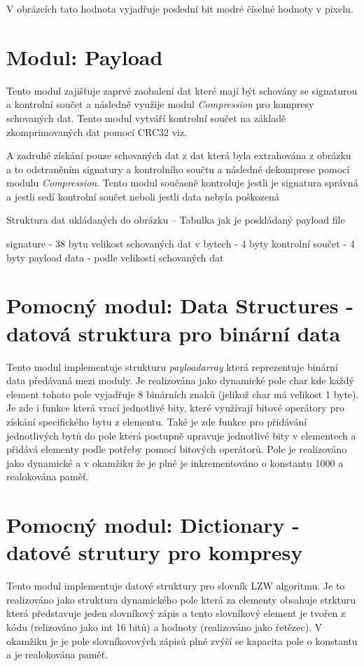 \documentclass[12pt]{report}
\begin{document}
    V obrázcích tato hodnota vyjadřuje poslední bit modré číselné hodnoty v pixelu.

    \section{Modul: Payload}
    Tento modul zajišťuje zaprvé zaobalení dat které mají být schovány se signaturou a kontrolní součet a následně využije modul \textit{Compression} pro kompresy schovaných dat. Tento modul vytváří kontrolní součet na základě zkomprimovaných dat pomocí CRC32 viz.

    A zadruhé získání pouze schovaných dat z dat která byla extrahována z obrázku a to odstraněním signatury a kontrolního součtu a následné dekomprese pomocí modulu \textit{Compression}. Tento modul současně kontroluje jestli je signatura správná a jestli sedí kontrolní součet neboli jestli data nebyla poškozená

    Struktura dat ukládaných do obrázku
    -- Tabulka jak je poskládaný payload file

    signature - 38 bytu
    velikost schovaných dat v bytech - 4 byty
    kontrolní součet - 4 byty
    payload data - podle velikosti schovaných dat


    \section{Pomocný modul: Data Structures - datová struktura pro binární data}
    Tento modul implementuje strukturu \textit{payloadarray} která reprezentuje binární data předávaná mezi moduly. Je realizována jako dynamické pole char kde každý element tohoto pole vyjadřuje 8 binárních znaků (jelikož char má velikost 1 byte). Je zde i funkce která vrací jednotlivé bity, které využívají bitové operátory pro získání specifického bytu z elementu. Také je zde funkce pro přidávání jednotlivých bytů do pole která postupně upravuje jednotlivé bity v elementech a přidává elementy podle potřeby pomocí bitových operátorů. Pole je realizováno jako dynamické a v okamžiku že je plné je inkrementováno o konstantu 1000 a realokována paměť.


    \section{Pomocný modul: Dictionary - datové strutury pro kompresy}
    Tento modul implementuje datové struktury pro slovník LZW algoritmu.
    Je to realizováno jako struktura dynamického pole která za elementy obsahuje strkturu která představuje jeden slovníkový zápis a tento slovníkový element je tvořen z kódu (relizováno jako int 16 bitů) a hodnoty (realizováno jako řetězec). V okamžiku je je pole slovníkovových zápisů plné zvýší se kapacita pole o konstantu a je realokována paměť.
\end{document}
